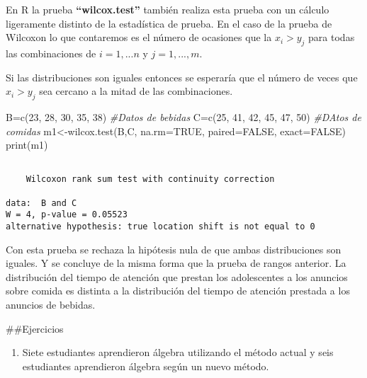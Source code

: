 \documentclass[
  a4paper,
  oneside,
  openany]{book}
\newenvironment{Shaded}{\begin{snugshade}}{\end{snugshade}}
\newcommand{\AttributeTok}[1]{\textcolor[rgb]{0.77,0.63,0.00}{#1}}
\newcommand{\CommentTok}[1]{\textcolor[rgb]{0.56,0.35,0.01}{\textit{#1}}}
\newcommand{\ConstantTok}[1]{\textcolor[rgb]{0.00,0.00,0.00}{#1}}
\newcommand{\DecValTok}[1]{\textcolor[rgb]{0.00,0.00,0.81}{#1}}
\newcommand{\FunctionTok}[1]{\textcolor[rgb]{0.00,0.00,0.00}{#1}}
\newcommand{\NormalTok}[1]{#1}
\newcommand{\OtherTok}[1]{\textcolor[rgb]{0.56,0.35,0.01}{#1}}
\providecommand{\tightlist}{%
  \setlength{\itemsep}{0pt}\setlength{\parskip}{0pt}}
\begin{document}
En R la prueba \textbf{``wilcox.test''} también realiza esta prueba con un cálculo ligeramente distinto de la estadística de prueba. En el caso de la prueba de Wilcoxon lo que contaremos es el número de ocasiones que la \(x_i>y_j\) para todas las combinaciones de \(i=1,...n\) y \(j=1,...,m\).

Si las distribuciones son iguales entonces se esperaría que el número de veces que \(x_i>y_j\) sea cercano a la mitad de las combinaciones.

\begin{Shaded}
\begin{Highlighting}[]
\NormalTok{B}\OtherTok{=}\FunctionTok{c}\NormalTok{(}\DecValTok{23}\NormalTok{, }\DecValTok{28}\NormalTok{, }\DecValTok{30}\NormalTok{, }\DecValTok{35}\NormalTok{, }\DecValTok{38}\NormalTok{)     }\CommentTok{\#Datos de bebidas}
\NormalTok{C}\OtherTok{=}\FunctionTok{c}\NormalTok{(}\DecValTok{25}\NormalTok{, }\DecValTok{41}\NormalTok{, }\DecValTok{42}\NormalTok{, }\DecValTok{45}\NormalTok{, }\DecValTok{47}\NormalTok{, }\DecValTok{50}\NormalTok{) }\CommentTok{\#DAtos de comidas}
\NormalTok{m1}\OtherTok{\textless{}{-}}\FunctionTok{wilcox.test}\NormalTok{(B,C, }\AttributeTok{na.rm=}\ConstantTok{TRUE}\NormalTok{, }\AttributeTok{paired=}\ConstantTok{FALSE}\NormalTok{, }\AttributeTok{exact=}\ConstantTok{FALSE}\NormalTok{)}
\FunctionTok{print}\NormalTok{(m1)}
\end{Highlighting}
\end{Shaded}

\begin{verbatim}

    Wilcoxon rank sum test with continuity correction

data:  B and C
W = 4, p-value = 0.05523
alternative hypothesis: true location shift is not equal to 0
\end{verbatim}

Con esta prueba se rechaza la hipótesis nula de que ambas distribuciones son iguales. Y se concluye de la misma forma que la prueba de rangos anterior. La distribución del tiempo de atención que prestan los adolescentes a los anuncios sobre comida es distinta a la distribución del tiempo de atención prestada a los anuncios de bebidas.

\#\#Ejercicios

\begin{enumerate}
\def\labelenumi{\arabic{enumi}.}
\tightlist
\item
  Siete estudiantes aprendieron álgebra utilizando el método actual y seis estudiantes aprendieron álgebra según un nuevo método.
\end{enumerate}
\end{document}
